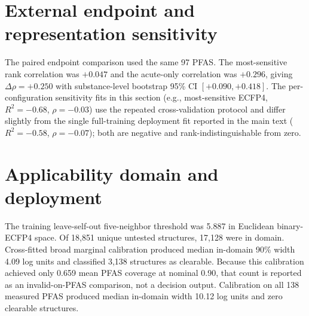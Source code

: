 \documentclass[11pt]{article}
\begin{document}
\section{External endpoint and representation sensitivity}

\begin{table}[h]
\centering
\caption{External PFAS performance after structure locking.}
\end{table}

The paired endpoint comparison used the same 97 PFAS. The most-sensitive rank correlation
was $+0.047$ and the acute-only correlation was $+0.296$, giving
$\Delta\rho=+0.250$ with substance-level bootstrap 95\% CI $[+0.090,+0.418]$. The per-configuration sensitivity fits in this section (e.g., most-sensitive ECFP4, $R^2=-0.68$, $\rho=-0.03$) use the repeated cross-validation protocol and differ slightly from the single full-training deployment fit reported in the main text ($R^2=-0.58$, $\rho=-0.07$); both are negative and rank-indistinguishable from zero.

\section{Applicability domain and deployment}

The training leave-self-out five-neighbor threshold was 5.887 in Euclidean binary-ECFP4
space. Of 18,851 unique untested structures, 17,128 were in domain. Cross-fitted broad
marginal calibration produced median in-domain 90\% width 4.09 log units and classified
3,138 structures as clearable. Because this calibration achieved only 0.659 mean PFAS
coverage at nominal 0.90, that count is reported as an invalid-on-PFAS comparison, not a
decision output. Calibration on all 138 measured PFAS produced median in-domain width
10.12 log units and zero clearable structures.
\end{document}
